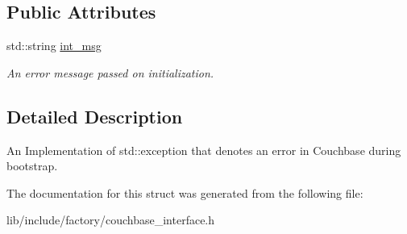 \subsection*{Public Attributes}
\begin{DoxyCompactItemize}
\item 
\hypertarget{structCouchbaseBootstrapException_a95a224b94ed150bfd5b3015c84bbd56c}{std\-::string \hyperlink{structCouchbaseBootstrapException_a95a224b94ed150bfd5b3015c84bbd56c}{int\-\_\-msg}}\label{structCouchbaseBootstrapException_a95a224b94ed150bfd5b3015c84bbd56c}

\begin{DoxyCompactList}\small\item\em An error message passed on initialization. \end{DoxyCompactList}\end{DoxyCompactItemize}


\subsection{Detailed Description}
An Implementation of std\-::exception that denotes an error in Couchbase during bootstrap. 

The documentation for this struct was generated from the following file\-:\begin{DoxyCompactItemize}
\item 
lib/include/factory/couchbase\-\_\-interface.\-h\end{DoxyCompactItemize}
